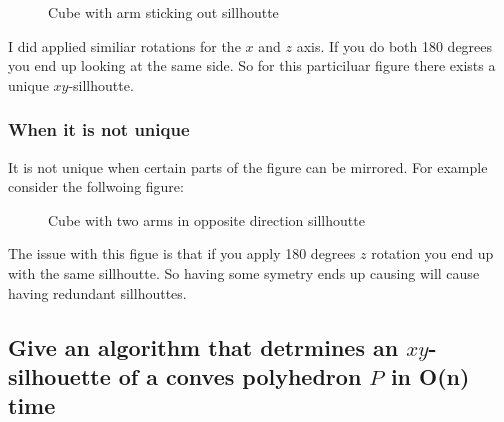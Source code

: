 \documentclass{article}
\begin{document}
\begin{empfile}
\begin{figure}
\caption{Cube with arm sticking out sillhoutte}
\end{figure}

I did applied similiar rotations for the $x$ and $z$ axis. If you
do both 180 degrees you end up looking at the same side. So for this
particiluar figure there exists a unique $xy$-sillhoutte.

\subsubsection{When it is not unique}

It is not unique when certain parts of the figure can be mirrored. For
example consider the follwoing figure:

\begin{figure}
\caption{Cube with two arms in opposite direction sillhoutte}
\end{figure}

The issue with this figue is that if you apply 180 degrees $z$ rotation you
end up with the same sillhoutte. So having some symetry ends up causing will
cause having redundant sillhouttes.

\subsection{Give an algorithm that detrmines an $xy$-silhouette of a conves polyhedron $P$ in O(n) time}


\end{empfile}
\end{document}
